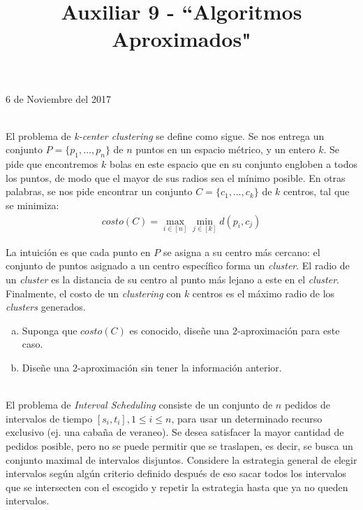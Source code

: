 \documentclass[dcc,uchile]{fcfmcourse}
\title{Auxiliar 9 - ``Algoritmos Aproximados"}
\theoremstyle{plain}
\theoremstyle{definition}
\begin{document}
\maketitle
\begin{center}
6 de Noviembre del 2017
\end{center}


\vspace{-1ex}


\begin{problems}
\\
El problema de \textit{k-center clustering} se define como sigue. Se nos entrega un conjunto $P =
\{p_1, \ldots, p_n\}$ de $n$ puntos en un espacio métrico, y un entero $k$. Se pide que encontremos $k$ bolas en este espacio que en su conjunto engloben a todos los puntos, de modo que el mayor
de sus radios sea el mínimo posible. En otras palabras, se nos pide encontrar un conjunto
$C = \{c_1, \ldots, c_k\}$ de $k$ centros, tal que se minimiza:
\begin{align*}
    costo(C) = \max_{i\in [n]}\min_{j\in[k]} d(p_i,c_j)
\end{align*}

La intuición es que cada punto en $P$ se asigna a su centro más cercano: el conjunto de puntos
asignado a un centro específico forma un \textit{cluster}. El radio de un \textit{cluster} es la distancia de su centro al punto más lejano a este en el \textit{cluster}. Finalmente, el costo de un \textit{clustering} con $k$ centros es el máximo radio de los \textit{clusters} generados.

\begin{enumerate}[a)]
\item Suponga que $costo(C)$ es conocido, diseñe una $2$-aproximación para este caso.
\item Diseñe una $2$-aproximación sin tener la información anterior.
\end{enumerate}

\\
El problema de \textit{Interval Scheduling} consiste de un conjunto de $n$ pedidos de intervalos de tiempo $[s_{i}, t_{i}], 1 \le i \le n$, para usar un determinado recurso exclusivo (ej. una cabaña de veraneo). Se desea satisfacer la mayor cantidad de pedidos posible, pero no se puede permitir que se traslapen, es decir, se busca un conjunto maximal de intervalos disjuntos. Considere la estrategia general de elegir intervalos según algún criterio definido después de eso sacar todos los intervalos que se intersecten con el escogido y repetir la estrategia hasta que ya no queden intervalos.


\end{problems}
\end{document}
